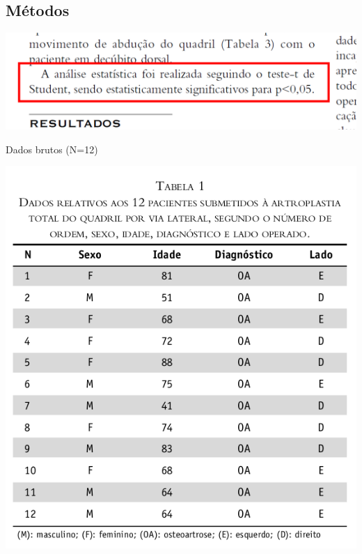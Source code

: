 \documentclass{beamer}
\begin{document}
\subsection{Métodos}

\begin{frame}{}
  \begin{center}
    \includegraphics[width=\textwidth]{figuras/metodologia}
  \end{center}
\end{frame}

\begin{frame}{Dados brutos (N=12)}
  \begin{center}
    \includegraphics[height=.9\textheight]{figuras/tabela1}
  \end{center}
\end{frame}
\end{document}
